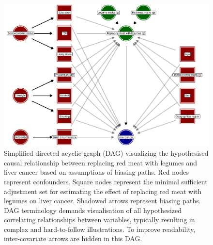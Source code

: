 \documentclass[
]{article}
\begin{document}
\begin{figure}[h]

{\centering \includegraphics[width=1\linewidth,]{supplementary-materials_files/figure-latex/fig2-1} 

}

\caption{Simplified directed acyclic graph (DAG) visualizing the hypothesised causal relationship between replacing red meat with legumes and liver cancer based on assumptions of biasing paths. Red nodes represent confounders. Square nodes represent the minimal sufficient adjustment set for estimating the effect of replacing red meat with legumes on liver cancer. Shadowed arrows represent biasing paths. DAG terminology demands visualisation of all hypothesized correlating relationships between variables, typically resulting in complex and hard-to-follow illustrations. To improve readability, inter-covariate arrows are hidden in this DAG.}\label{fig:fig2}
\end{figure}

\printbibliography
\end{document}
